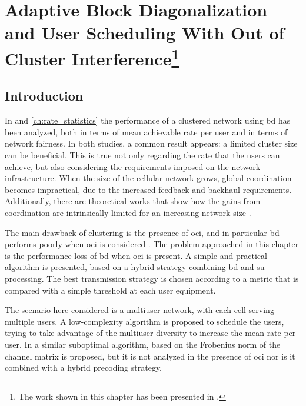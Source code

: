 \chapter[Adaptive User Scheduling]{Adaptive Block Diagonalization and User
Scheduling With Out of Cluster Interference\footnote{The work shown in this
chapter has been presented in \cite{jjgarcia14}.}}\label{ch:adaptive_schedule}

\section{Introduction}\label{sec:sched_intro}

In  and \ref{ch:rate_statistics} the performance of a
clustered network using \gls{bd} has been analyzed, both in terms of mean
achievable rate per user and in terms of network fairness. In both studies, a
common result appears: a limited cluster size can be beneficial. This is true
not only regarding the rate that the users can achieve, but also considering
the requirements imposed on the network infrastructure. When the size of the
cellular network grows, global coordination becomes impractical, due to the
increased feedback and backhaul requirements. Additionally, there are
theoretical works that show how the gains from coordination are intrinsically
limited for an increasing network size \cite{lozano13}.

The main drawback of clustering is the presence of \gls{oci}, and in particular
\gls{bd} performs poorly when \gls{oci} is considered \cite{shim08}. The problem
approached in this chapter is the performance loss of \gls{bd} when \gls{oci} is
present. A simple and practical algorithm is presented, based on a hybrid
strategy combining \gls{bd} and \gls{su} processing. The best transmission
strategy is chosen according to a metric that is compared with a simple
threshold at each user equipment.

The scenario here considered is a multiuser network, with each cell serving
multiple users. A low-complexity algorithm is proposed to schedule the users,
trying to take advantage of the multiuser diversity to increase the mean rate
per user. In \cite{shen06} a similar suboptimal algorithm, based on the
Frobenius norm of the channel matrix is proposed, but it is not analyzed in the
presence of \gls{oci} nor is it combined with a hybrid precoding strategy.

